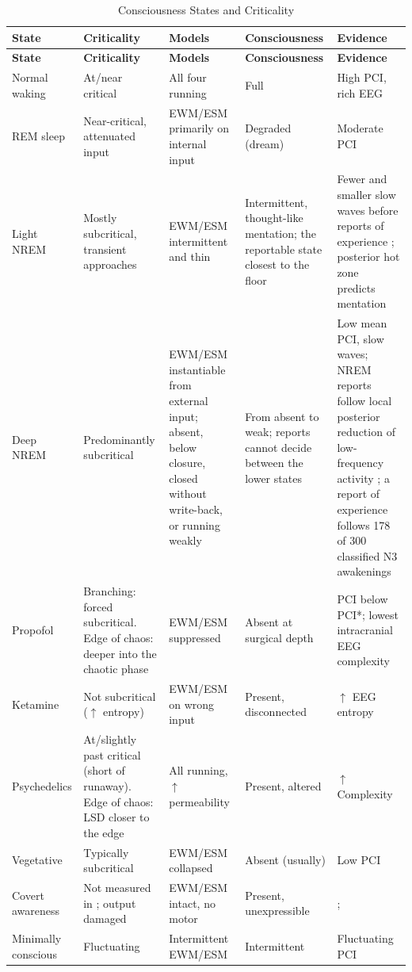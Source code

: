 \documentclass[12pt]{article}
\begin{document}
{\small
\begin{xltabular}{\textwidth}{p{2.2cm}XXXX}
\caption{Consciousness States and Criticality}\\
\toprule
\textbf{State} & \textbf{Criticality} & \textbf{Models} & \textbf{Consciousness} & \textbf{Evidence} \\
\midrule
\endfirsthead
\toprule
\textbf{State} & \textbf{Criticality} & \textbf{Models} & \textbf{Consciousness} & \textbf{Evidence} \\
\midrule
\endhead
Normal waking & At/near critical & All four running & Full & High PCI, rich EEG \\
REM sleep & Near-critical, attenuated input & EWM/ESM primarily on internal input & Degraded (dream) & Moderate PCI \\
Light NREM & Mostly subcritical, transient approaches & EWM/ESM intermittent and thin & Intermittent, thought-like mentation; the reportable state closest to the floor & Fewer and smaller slow waves before reports of experience \citep{Siclari2018}; posterior hot zone predicts mentation \citep{Siclari2017} \\
Deep NREM & Predominantly subcritical & EWM/ESM instantiable from external input; absent, below closure, closed without write-back, or running weakly & From absent to weak; reports cannot decide between the lower states & Low mean PCI, slow waves; NREM reports follow local posterior reduction of low-frequency activity \citep{Siclari2017}; a report of experience follows 178 of 300 classified N3 awakenings \citep{Wong2025} \\
Propofol & Branching: forced subcritical. Edge of chaos: deeper into the chaotic phase \citep{Toker2022} & EWM/ESM suppressed & Absent at surgical depth & PCI below PCI*; lowest intracranial EEG complexity \citep{Jeantin2026} \\
Ketamine & Not subcritical ($\uparrow$ entropy) & EWM/ESM on wrong input & Present, disconnected & $\uparrow$ EEG entropy \\
Psychedelics & At/slightly past critical (short of runaway). Edge of chaos: LSD closer to the edge \citep{Toker2022} & All running, $\uparrow$ permeability & Present, altered & $\uparrow$ Complexity \citep{Nikolic2026} \\
Vegetative & Typically subcritical & EWM/ESM collapsed & Absent (usually) & Low PCI \\
Covert awareness & Not measured in \citet{Owen2006}; output damaged & EWM/ESM intact, no motor & Present, unexpressible & \citet{Owen2006}; \citet{Toker2026} \\
Minimally conscious & Fluctuating & Intermittent EWM/ESM & Intermittent & Fluctuating PCI \\
\bottomrule
\end{xltabular}}
\end{document}
